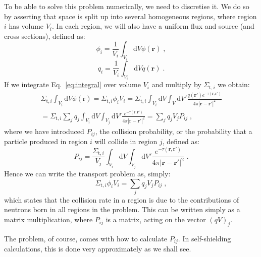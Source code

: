 To be able to solve this problem numerically, we need to discretise it. We do so by asserting that space is split up into several homogeneous regions, where region $i$ has volume $V_i$. In each region, we will also have a uniform flux and source (and cross sections), defined as:
\begin{equation*}
    \phi_i = \frac{1}{V_i}\int_{V_i}\mathrm{d}V \phi(\mathbf{r})\;\mathrm{,}
\end{equation*}
\begin{equation*}
    q_i = \frac{1}{V_i}\int_{V_i}\mathrm{d}V q(\mathbf{r})\;\mathrm{.}
\end{equation*}
If we integrate Eq.~\eqref{eq:integral} over volume $V_i$ and multiply by $\Sigma_{\mathrm{t},i}$ we obtain:
\begin{equation}
\begin{split}
    \Sigma_{\mathrm{t},i}\int_{V_i}\mathrm{d}V\phi(\mathrm{r}) = \Sigma_{\mathrm{t},i}\phi_i V_i = \Sigma_{\mathrm{t},i} \int_{V_i}\mathrm{d}V\int_{V}\mathrm{d}V' \frac{q(\mathbf{r'}) e^{-\tau(\mathbf{r},\mathbf{r}')}}{4\pi|\mathbf{r}-\mathbf{r}'|^2} \\
    = \Sigma_{\mathrm{t},i}\sum_j q_j \int_{V_i}\mathrm{d}V\int_{V_j}\mathrm{d}V' \frac{e^{-\tau(\mathbf{r},\mathbf{r}')}}{4\pi|\mathbf{r}-\mathbf{r}'|^2} = \sum_j q_j V_j P_{ij}\;\mathrm{,}
\end{split}
\end{equation}
where we have introduced $P_{ij}$, the collision probability, or the probability that a particle produced in region $i$ will collide in region $j$, defined as:
\begin{equation}
    P_{ij} = \frac{\Sigma_{\mathrm{t},i}}{V_j}\int_{V_i}\mathrm{d}V\int_{V_j}\mathrm{d}V'\frac{e^{-\tau(\mathbf{r},\mathbf{r}')}}{4\pi|\mathbf{r}-\mathbf{r}'|^2}\;\mathrm{.}
\end{equation}
Hence we can write the transport problem as, simply:
\begin{equation}
    \Sigma_{\mathrm{t},i}\phi_i V_i = \sum_j q_j V_j P_{ij}\;\mathrm{,}
\end{equation}
which states that the collision rate in a region is due to the contributions of neutrons born in all regions in the problem. This can be written simply as a matrix multiplication, where $P_{ij}$ is a matrix, acting on the vector $(qV)_j$.

The problem, of course, comes with how to calculate $P_{ij}$. In self-shielding calculations, this is done very approximately as we shall see.

